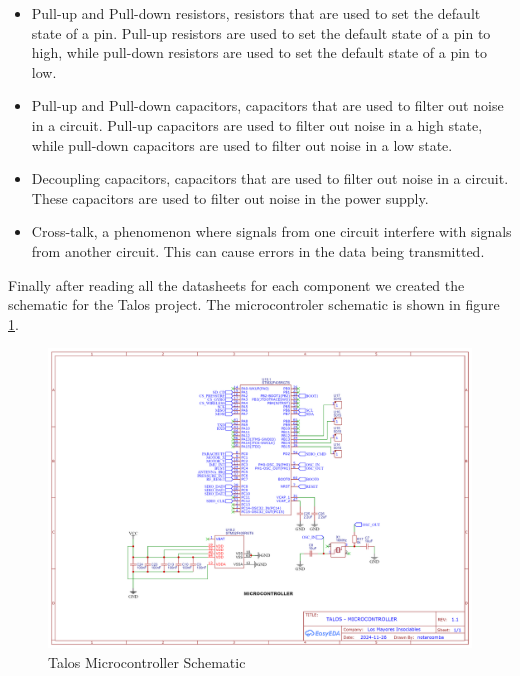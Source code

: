 \documentclass{article}
\begin{document}
\begin{itemize}
      \item Pull-up and Pull-down resistors, resistors that are used to set the default state of a pin. Pull-up resistors are used to set the default state of a pin to high, while pull-down resistors are used to set the default state of a pin to low.
      \item Pull-up and Pull-down capacitors, capacitors that are used to filter out noise in a circuit. Pull-up capacitors are used to filter out noise in a high state, while pull-down capacitors are used to filter out noise in a low state.
      \item Decoupling capacitors, capacitors that are used to filter out noise in a circuit. These capacitors are used to filter out noise in the power supply.
      \item Cross-talk, a phenomenon where signals from one circuit interfere with signals from another circuit. This can cause errors in the data being transmitted.


\end{itemize}
Finally after reading all the datasheets for each component we created the schematic for the Talos project. The microcontroler schematic is shown in figure \ref{fig:talos_microcontroller_schematic}.
\begin{figure}[h]
      \caption{Talos Microcontroller Schematic}
      \label{fig:talos_microcontroller_schematic}
      \centering
      \includegraphics[width=\textwidth]{Microcontroller.png}
\end{figure}
\end{document}
